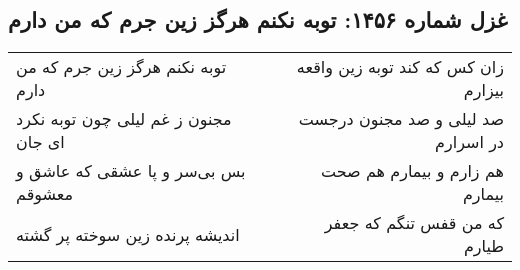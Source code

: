 \begin{center}
\section*{غزل شماره ۱۴۵۶: توبه نکنم هرگز زین جرم که من دارم}
\label{sec:1456}
\begin{longtable}{l p{0.5cm} r}
توبه نکنم هرگز زین جرم که من دارم
&&
زان کس که کند توبه زین واقعه بیزارم
\\
مجنون ز غم لیلی چون توبه نکرد ای جان
&&
صد لیلی و صد مجنون درجست در اسرارم
\\
بس بی‌سر و پا عشقی که عاشق و معشوقم
&&
هم زارم و بیمارم هم صحت بیمارم
\\
اندیشه پرنده زین سوخته پر گشته
&&
که من قفس تنگم که جعفر طیارم
\\
\end{longtable}
\end{center}
